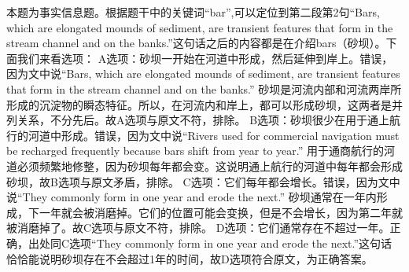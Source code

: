 \begin{blk}
    \begin{nlz}
        本题为事实信息题。根据题干中的关键词“bar”,可以定位到第二段第2句“Bars, which are elongated mounds of sediment, are transient features that form in the stream channel and on the banks.”这句话之后的内容都是在介绍bars（砂坝）。下面我们来看选项： A选项：砂坝一开始在河道中形成，然后延伸到岸上。错误，因为文中说“Bars, which are elongated mounds of sediment, are transient features that form in the stream channel and on the banks.” 砂坝是河流内部和河流两岸所形成的沉淀物的瞬态特征。所以，在河流内和岸上，都可以形成砂坝，这两者是并列关系，不分先后。故A选项与原文不符，排除。 B选项：砂坝很少在用于通上航行的河道中形成。错误，因为文中说“Rivers used for commercial navigation must be recharged frequently because bars shift from year to year.” 用于通商航行的河道必须频繁地修整，因为砂坝每年都会变。这说明通上航行的河道中每年都会形成砂坝，故B选项与原文矛盾，排除。 C选项：它们每年都会增长。错误，因为文中说“They commonly form in one year and erode the next.” 砂坝通常在一年内形成，下一年就会被消磨掉。它们的位置可能会变换，但是不会增长，因为第二年就被消磨掉了。故C选项与原文不符，排除。 D选项：它们通常存在不超过一年。正确，出处同C选项“They commonly form in one year and erode the next.”这句话恰恰能说明砂坝存在不会超过1年的时间，故D选项符合原文，为正确答案。
    \end{nlz}
\end{blk}

